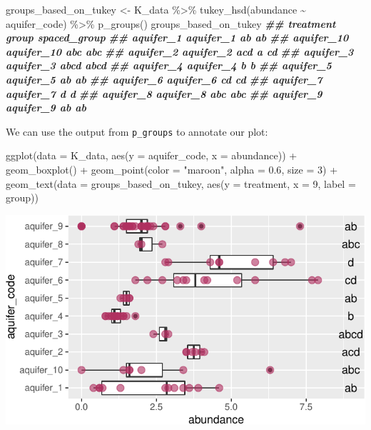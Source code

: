 \documentclass[
]{krantz}
\newenvironment{Shaded}{\begin{snugshade}}{\end{snugshade}}
\newcommand{\AttributeTok}[1]{\textcolor[rgb]{0.77,0.63,0.00}{#1}}
\newcommand{\DecValTok}[1]{\textcolor[rgb]{0.00,0.00,0.81}{#1}}
\newcommand{\DocumentationTok}[1]{\textcolor[rgb]{0.56,0.35,0.01}{\textbf{\textit{#1}}}}
\newcommand{\FloatTok}[1]{\textcolor[rgb]{0.00,0.00,0.81}{#1}}
\newcommand{\FunctionTok}[1]{\textcolor[rgb]{0.00,0.00,0.00}{#1}}
\newcommand{\NormalTok}[1]{#1}
\newcommand{\OtherTok}[1]{\textcolor[rgb]{0.56,0.35,0.01}{#1}}
\newcommand{\SpecialCharTok}[1]{\textcolor[rgb]{0.00,0.00,0.00}{#1}}
\newcommand{\StringTok}[1]{\textcolor[rgb]{0.31,0.60,0.02}{#1}}
\begin{document}
\begin{Shaded}
\begin{Highlighting}[]
\NormalTok{groups\_based\_on\_tukey }\OtherTok{\textless{}{-}}\NormalTok{ K\_data }\SpecialCharTok{\%\textgreater{}\%}
  \FunctionTok{tukey\_hsd}\NormalTok{(abundance }\SpecialCharTok{\textasciitilde{}}\NormalTok{ aquifer\_code) }\SpecialCharTok{\%\textgreater{}\%}
  \FunctionTok{p\_groups}\NormalTok{()}
\NormalTok{groups\_based\_on\_tukey}
\DocumentationTok{\#\#             treatment group spaced\_group}
\DocumentationTok{\#\# aquifer\_1   aquifer\_1    ab         ab  }
\DocumentationTok{\#\# aquifer\_10 aquifer\_10   abc         abc }
\DocumentationTok{\#\# aquifer\_2   aquifer\_2   acd         a cd}
\DocumentationTok{\#\# aquifer\_3   aquifer\_3  abcd         abcd}
\DocumentationTok{\#\# aquifer\_4   aquifer\_4     b          b  }
\DocumentationTok{\#\# aquifer\_5   aquifer\_5    ab         ab  }
\DocumentationTok{\#\# aquifer\_6   aquifer\_6    cd           cd}
\DocumentationTok{\#\# aquifer\_7   aquifer\_7     d            d}
\DocumentationTok{\#\# aquifer\_8   aquifer\_8   abc         abc }
\DocumentationTok{\#\# aquifer\_9   aquifer\_9    ab         ab}
\end{Highlighting}
\end{Shaded}

We can use the output from \texttt{p\_groups} to annotate our plot:

\begin{Shaded}
\begin{Highlighting}[]
\FunctionTok{ggplot}\NormalTok{(}\AttributeTok{data =}\NormalTok{ K\_data, }\FunctionTok{aes}\NormalTok{(}\AttributeTok{y =}\NormalTok{ aquifer\_code, }\AttributeTok{x =}\NormalTok{ abundance)) }\SpecialCharTok{+}
  \FunctionTok{geom\_boxplot}\NormalTok{() }\SpecialCharTok{+}
  \FunctionTok{geom\_point}\NormalTok{(}\AttributeTok{color =} \StringTok{"maroon"}\NormalTok{, }\AttributeTok{alpha =} \FloatTok{0.6}\NormalTok{, }\AttributeTok{size =} \DecValTok{3}\NormalTok{) }\SpecialCharTok{+}
  \FunctionTok{geom\_text}\NormalTok{(}\AttributeTok{data =}\NormalTok{ groups\_based\_on\_tukey, }\FunctionTok{aes}\NormalTok{(}\AttributeTok{y =}\NormalTok{ treatment, }\AttributeTok{x =} \DecValTok{9}\NormalTok{, }\AttributeTok{label =}\NormalTok{ group))}
\end{Highlighting}
\end{Shaded}

\begin{center}\includegraphics[width=0.8\linewidth]{index_files/figure-latex/unnamed-chunk-150-1} \end{center}
\end{document}
